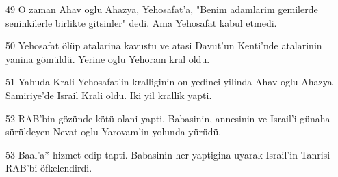 \par 49 O zaman Ahav oglu Ahazya, Yehosafat'a, "Benim adamlarim gemilerde seninkilerle birlikte gitsinler" dedi. Ama Yehosafat kabul etmedi.
\par 50 Yehosafat ölüp atalarina kavustu ve atasi Davut'un Kenti'nde atalarinin yanina gömüldü. Yerine oglu Yehoram kral oldu.
\par 51 Yahuda Krali Yehosafat'in kralliginin on yedinci yilinda Ahav oglu Ahazya Samiriye'de Israil Krali oldu. Iki yil krallik yapti.
\par 52 RAB'bin gözünde kötü olani yapti. Babasinin, annesinin ve Israil'i günaha sürükleyen Nevat oglu Yarovam'in yolunda yürüdü.
\par 53 Baal'a* hizmet edip tapti. Babasinin her yaptigina uyarak Israil'in Tanrisi RAB'bi öfkelendirdi.


